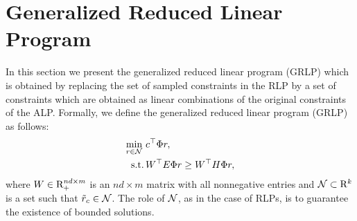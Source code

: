 \section{Generalized Reduced Linear Program}
In this section we present the generalized reduced linear program (GRLP) which is obtained by replacing the set of sampled constraints in the RLP by a set of constraints which are obtained as linear combinations of the original constraints of the ALP. Formally, we define the generalized reduced linear program (GRLP) as follows:
\begin{align}\label{grlp}
\begin{split}
\underset{r\in \N}{\min}\, &\, c^\top \Phi r,\\
\text{s.t.}\mb & \,W^\top E\Phi r\geq W^\top H \Phi r, 
\end{split}
\end{align}
where $W \in \mathrm{R}_+^{nd\times m}$ is an $nd\times m$ matrix with all nonnegative entries and 
$\mathcal{N} \subset \mathrm{R}^k$ is a set such that $\tilde{r}_c \in \mathcal{N}$. 
The role of $\mathcal{N}$, as in the case of RLPs, is to guarantee
the existence of bounded solutions. 

